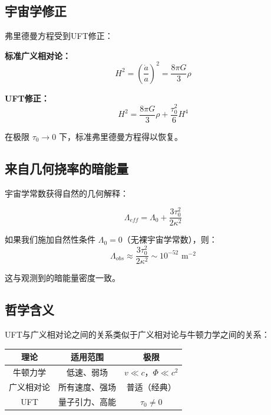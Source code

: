 \subsection{宇宙学修正}

弗里德曼方程受到UFT修正：

\textbf{标准广义相对论：}
\begin{equation}
    H^2 = \left(\frac{\dot{a}}{a}\right)^2 = \frac{8\pi G}{3}\rho
\end{equation}

\textbf{UFT修正：}
\begin{equation}
    H^2 = \frac{8\pi G}{3}\rho + \frac{\tau_0^2}{6}H^4
    \label{eq:modified_friedmann}
\end{equation}

在极限 $\tau_0 \to 0$ 下，标准弗里德曼方程得以恢复。

\subsection{来自几何挠率的暗能量}

宇宙学常数获得自然的几何解释：

\begin{equation}
    \Lambda_{eff} = \Lambda_0 + \frac{3\tau_0^2}{2\kappa^2}
    \label{eq:dark_energy_torsion}
\end{equation}

如果我们施加自然性条件 $\Lambda_0 = 0$（无裸宇宙学常数），则：
\begin{equation}
    \Lambda_{obs} \approx \frac{3\tau_0^2}{2\kappa^2} \sim 10^{-52} \text{ m}^{-2}
\end{equation}

这与观测到的暗能量密度一致。

\subsection{哲学含义}

UFT与广义相对论之间的关系类似于广义相对论与牛顿力学之间的关系：

\begin{center}
\begin{tabular}{@{}ccc@{}}
\toprule
理论 & 适用范围 & 极限 \\
\midrule
牛顿力学 & 低速、弱场 & $v \ll c$，$\Phi \ll c^2$ \\
广义相对论 & 所有速度、强场 & 普适（经典） \\
UFT & 量子引力、高能 & $\tau_0 \neq 0$ \\
\bottomrule
\end{tabular}
\end{center}

